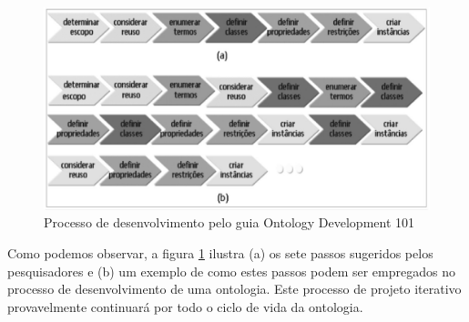  \begin{figure}[ht]
	\centering
		\includegraphics[keepaspectratio=true,scale=0.5]{figuras/ab.eps}
	\caption{Processo de desenvolvimento pelo guia Ontology Development 101}
	\label{fig:ab}
\end{figure}


Como podemos observar, a figura \ref{fig:ab} ilustra (a) os sete passos sugeridos pelos pesquisadores e (b) um exemplo de como estes passos podem ser empregados no processo de desenvolvimento de uma ontologia.
Este processo de projeto iterativo provavelmente continuará por todo o ciclo de vida da ontologia.

